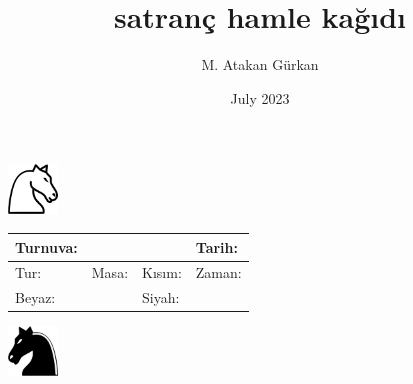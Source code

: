 \documentclass{letter}
\title{satranç hamle kağıdı}
\author{M. Atakan Gürkan}
\date{July 2023}
\newlength{\rhh}
\newlength{\rh}
\begin{document}
\includegraphics[width=0.1\textwidth]{saga-bakan-beyaz-at.png}
{\footnotesize\slshape
\begin{tabularx}{0.75\textwidth}{XXXX}\hline
  Turnuva:  &~ &~ & Tarih: \\[\rhh]\hline
  Tur: & Masa: & Kısım: &Zaman:\\[\rhh]\hline
  \multicolumn{2}{l}{Beyaz:}   &\multicolumn{2}{l}{Siyah:}\\[\rhh]\hline
\end{tabularx}
}
\includegraphics[width=0.1\textwidth]{sola-bakan-siyah-at.png}
\end{document}
